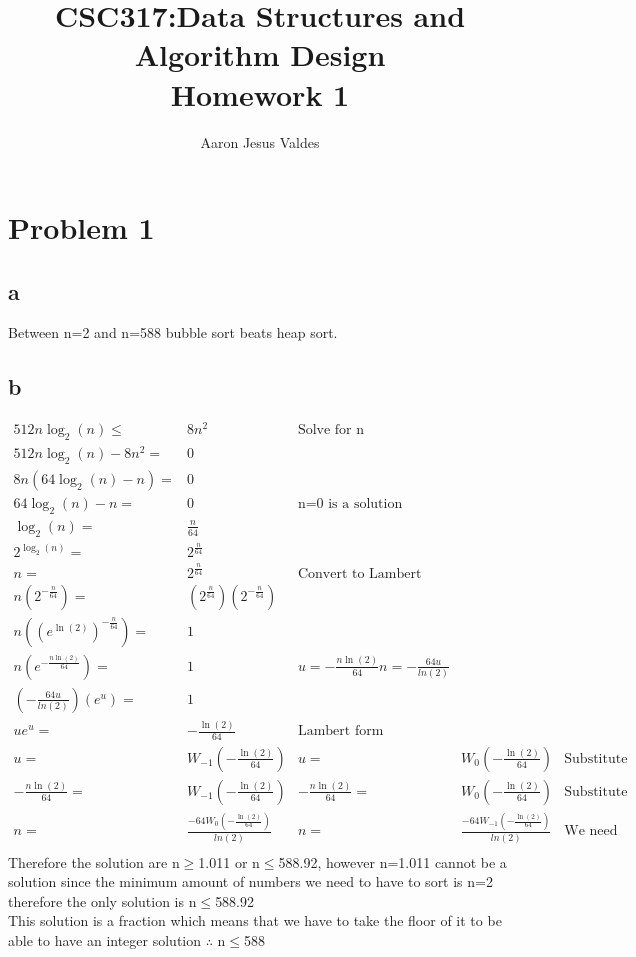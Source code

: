 \documentclass[11pt]{article}
\title{\Huge{CSC317:Data Structures and Algorithm Design}\\\LARGE{Homework 1}}
\author{Aaron Jesus Valdes}
\begin{document}
	\maketitle
	\clearpage
	\onehalfspacing
	\clearpage
	\section*{Problem 1}
		\subsection*{a}
		Between n=2 and n=588 bubble sort beats heap sort.
		\subsection*{b}
			\begin{align}
				512n\log_2 (n)\le&8n^2 &  \text{Solve for n}\\
				512n\log_2 (n) -8n^2 =&0 \\
				8n(64\log_2 (n) -n) =&0 \\
				64\log_2 (n) -n=&0 & \text{n=0 is a solution}\\
				\log_2(n)=&\frac{n}{64} \\
				2^{\log_2(n)}=&2^{\frac{n}{64}}\\
				n=&2^{\frac{n}{64}}& \text{Convert to Lambert form}\\
				n(2^{-\frac{n}{64}})=&(2^{\frac{n}{64}})(2^{-\frac{n}{64}})\\
				n((e^{\ln(2)})^{-\frac{n}{64}})=&1\\
				n(e^{-\frac{n \ln(2)}{64}})=&1 &u=-\frac{n \ln(2)}{64} n=-\frac{64u}{ln(2)}&\\
				(-\frac{64u}{ln(2)})(e^{u})=&1\\
				ue^u=&-\frac{\ln(2)}{64}& \text{Lambert form}\\
				u=&W_{-1}(-\frac{\ln(2)}{64})& u=&W_{0}(-\frac{\ln(2)}{64})&\text{Substitute u back}\\
-\frac{n \ln(2)}{64}=&W_{-1}(-\frac{\ln(2)}{64})& -\frac{n \ln(2)}{64}=&W_{0}(-\frac{\ln(2)}{64})&\text{Substitute u back}\\
n=&\frac{-64W_{0}(-\frac{\ln(2)}{64})}{ln(2)}&n=&\frac{-64W_{-1}(-\frac{\ln(2)}{64})}{ln(2)}& \text{We need to evaluate}\\
			\end{align}
			Therefore the solution are n$\ge$1.011 or n$\le$588.92, however n=1.011 cannot be a solution since the minimum amount of numbers we need to have to sort is n=2 therefore the only solution is n$\le$588.92\\
			This solution is a fraction which means that we have to take the floor of it to be able to have an integer solution
			$\therefore$ n$\le$588
\end{document}
